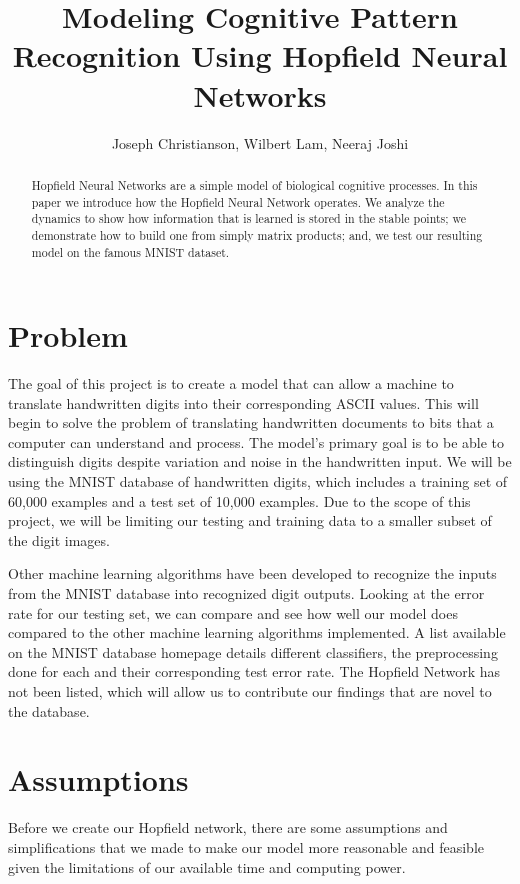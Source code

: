 \documentclass[]{article}
\title{Modeling Cognitive Pattern Recognition Using Hopfield Neural Networks}
\author{Joseph Christianson, Wilbert Lam, Neeraj Joshi}
\begin{document}
\maketitle

\begin{abstract}
Hopfield Neural Networks are a simple model of biological cognitive processes. In this paper we introduce how the Hopfield Neural Network operates. We analyze the dynamics to show how information that is learned is stored in the stable points; we demonstrate how to build one from simply matrix products; and, we test our resulting model on the famous MNIST dataset. 
\end{abstract}

\section{Problem}
The goal of this project is to create a model that can allow a machine to translate handwritten digits into their corresponding ASCII values. This will begin to solve the problem of translating handwritten documents to bits that a computer can understand and process. The model’s primary goal is to be able to distinguish digits despite variation and noise in the handwritten input. We will be using the MNIST database of handwritten digits, which includes a training set of 60,000 examples and a test set of 10,000 examples. Due to the scope of this project, we will be limiting our testing and training data to a smaller subset of the digit images. 

\hfill \break
Other machine learning algorithms have been developed to recognize the inputs from the MNIST database into recognized digit outputs. Looking at the error rate for our testing set, we can compare and see how well our model does compared to the other machine learning algorithms implemented. A list available on the MNIST database homepage details different classifiers, the preprocessing done for each and their corresponding test error rate. The Hopfield Network has not been listed, which will allow us to contribute our findings that are novel to the database. 

\section{Assumptions}
Before we create our Hopfield network, there are some assumptions and simplifications that we made to make our model more reasonable and feasible given the limitations of our available time and computing power.  
\end{document}
